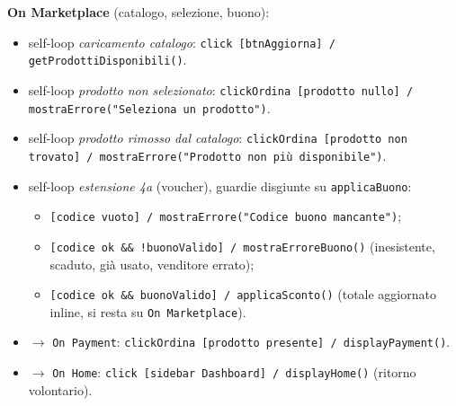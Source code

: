 \textbf{On Marketplace} (catalogo, selezione, buono):
\begin{itemize}
    \item self-loop \emph{caricamento catalogo}: \texttt{click [btnAggiorna] / getProdottiDisponibili()}.
    \item self-loop \emph{prodotto non selezionato}: \texttt{clickOrdina [prodotto nullo] / mostraErrore("Seleziona un prodotto")}.
    \item self-loop \emph{prodotto rimosso dal catalogo}: \texttt{clickOrdina [prodotto non trovato] / mostraErrore("Prodotto non più disponibile")}.
    \item self-loop \emph{estensione 4a} (voucher), guardie disgiunte su \texttt{applicaBuono}:
    \begin{itemize}
        \item \texttt{[codice vuoto] / mostraErrore("Codice buono mancante")};
        \item \texttt{[codice ok \&\& !buonoValido] / mostraErroreBuono()} (inesistente, scaduto, gi\`a usato, venditore errato);
        \item \texttt{[codice ok \&\& buonoValido] / applicaSconto()} (totale aggiornato inline, si resta su \texttt{On Marketplace}).
    \end{itemize}
    \item \(\to\) \texttt{On Payment}: \texttt{clickOrdina [prodotto presente] / displayPayment()}.
    \item \(\to\) \texttt{On Home}: \texttt{click [sidebar Dashboard] / displayHome()} (ritorno volontario).
\end{itemize}


